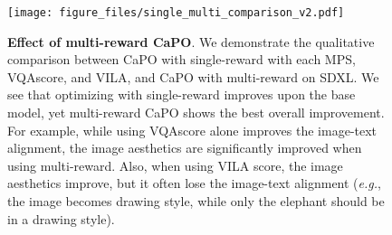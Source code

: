 \begin{figure}[t]
    \small\centering
    \texttt{[image: figure\_files/single\_multi\_comparison\_v2.pdf]}
    \caption{
    \textbf{Effect of multi-reward CaPO}. We demonstrate the qualitative comparison between CaPO with single-reward with each MPS, VQAscore, and VILA, and CaPO with multi-reward on SDXL.
    We see that optimizing with single-reward improves upon the base model, yet multi-reward CaPO shows the best overall improvement.
    For example, while using VQAscore alone improves the image-text alignment, the image aesthetics are significantly improved when using multi-reward. 
    Also, when using VILA score, the image aesthetics improve, but it often lose the image-text alignment (\emph{e.g.}, the image becomes drawing style, while only the elephant should be in a drawing style).}
    \label{fig:multi_effect}
\end{figure}